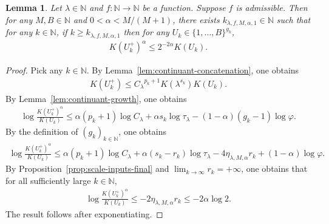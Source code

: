 \documentclass[10pt,a4paper]{amsart}
\newtheorem{lemma}{Lemma}
\begin{document}
\begin{lemma}
\label{lem:full-stage-comparison}
Let $\lambda\in\mathbb{N}$ and $f:\mathbb{N}\to\mathbb{N}$ be a function. Suppose $f$ is admissible. Then for any $M,B\in\mathbb{N}$ and $0<\alpha<M/(M+1)$, there exists $k_{\lambda,f,M,\alpha,1}\in\mathbb{N}$ such that for any $k\in\mathbb{N}$, if $k\geq k_{\lambda,f,M,\alpha,1}$ then for any $U_k\in\{1,\ldots,B\}^{g_k}$,
\begin{align*}
    K(U^+_k)^\alpha
    \leq 2^{-2\alpha}K(U_k).
\end{align*}
\end{lemma}
\begin{proof}
Pick any $k\in\mathbb{N}$. By Lemma~\ref{lem:continuant-concatenation}, one obtains
\begin{align*}
    K(U^+_k)
    \leq
    {C_\lambda}^{p_k+1}K(\lambda^{s_k})K(U_k).
\end{align*}
By Lemma~\ref{lem:continuant-growth}, one obtains
\begin{align*}
    \log{\frac{K(U^+_k)^\alpha}{K(U_k)}}
    \leq
    \alpha(p_k+1)\log C_\lambda
    +\alpha s_k\log\tau_\lambda
    -(1-\alpha)(g_k-1)\log\varphi.
\end{align*}
By the definition of $(g_k)_{k\in\mathbb{N}}$, one obtains
\begin{align*}
    \log{\frac{K(U^+_k)^\alpha}{K(U_k)}}
    \leq
    \alpha(p_k+1)\log C_\lambda+\alpha(s_k-r_k)\log\tau_\lambda
    -4\eta_{\lambda,M,\alpha} r_k+(1-\alpha)\log{\varphi}.
\end{align*}
By Proposition~\ref{prop:scale-inputs-final} and $\lim_{k\to\infty}r_k=+\infty$, one obtains that for all sufficiently large $k\in\mathbb{N}$, 
\begin{align*}
    \log{\frac{K(U^+_k)^\alpha}{K(U_k)}}\leq-2\eta_{\lambda,M,\alpha} r_k\leq -2\alpha\log 2.
\end{align*}
The result follows after exponentiating.
\end{proof}
\end{document}
